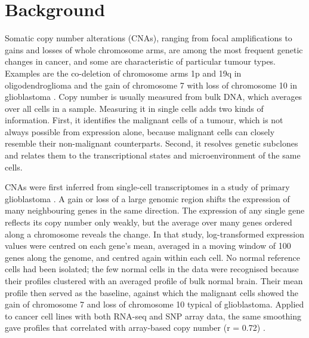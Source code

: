 \section{Background}\label{sec:introduction}

Somatic copy number alterations (CNAs), ranging from focal amplifications to gains and losses of whole chromosome arms, are among the most frequent genetic changes in cancer, and some are characteristic of particular tumour types. Examples are the co-deletion of chromosome arms 1p and 19q in oligodendroglioma and the gain of chromosome 7 with loss of chromosome 10 in glioblastoma \citep{tirosh2016oligo, patel2014}. Copy number is usually measured from bulk DNA, which averages over all cells in a sample. Measuring it in single cells adds two kinds of information. First, it identifies the malignant cells of a tumour, which is not always possible from expression alone, because malignant cells can closely resemble their non-malignant counterparts. Second, it resolves genetic subclones and relates them to the transcriptional states and microenvironment of the same cells.

CNAs were first inferred from single-cell transcriptomes in a study of primary glioblastoma \citep{patel2014}. A gain or loss of a large genomic region shifts the expression of many neighbouring genes in the same direction. The expression of any single gene reflects its copy number only weakly, but the average over many genes ordered along a chromosome reveals the change. In that study, log-transformed expression values were centred on each gene's mean, averaged in a moving window of 100 genes along the genome, and centred again within each cell. No normal reference cells had been isolated; the few normal cells in the data were recognised because their profiles clustered with an averaged profile of bulk normal brain. Their mean profile then served as the baseline, against which the malignant cells showed the gain of chromosome 7 and loss of chromosome 10 typical of glioblastoma. Applied to cancer cell lines with both RNA-seq and SNP array data, the same smoothing gave profiles that correlated with array-based copy number (r = 0.72) \citep{patel2014}.

